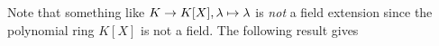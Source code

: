 \documentclass[../book.tex]{subfiles}
\begin{document}
\begin{rmk}
    
    Note that something like $K \to K[X], \lambda \mapsto \lambda$ is \emph{not}
    a field extension since the polynomial ring $K[X]$ is not a field. 
    The following result gives 

\end{rmk}



\end{document}
